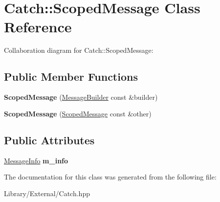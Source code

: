 \hypertarget{class_catch_1_1_scoped_message}{}\section{Catch\+:\+:Scoped\+Message Class Reference}
\label{class_catch_1_1_scoped_message}


Collaboration diagram for Catch\+:\+:Scoped\+Message\+:
\subsection*{Public Member Functions}
\begin{DoxyCompactItemize}
\item 
\hypertarget{class_catch_1_1_scoped_message_a5cc59f0f2ebe840e6607f83004d49a17}{}{\bfseries Scoped\+Message} (\hyperlink{struct_catch_1_1_message_builder}{Message\+Builder} const \&builder)\label{class_catch_1_1_scoped_message_a5cc59f0f2ebe840e6607f83004d49a17}

\item 
\hypertarget{class_catch_1_1_scoped_message_ae03a17fd47220d563d4abc73e7518e29}{}{\bfseries Scoped\+Message} (\hyperlink{class_catch_1_1_scoped_message}{Scoped\+Message} const \&other)\label{class_catch_1_1_scoped_message_ae03a17fd47220d563d4abc73e7518e29}

\end{DoxyCompactItemize}
\subsection*{Public Attributes}
\begin{DoxyCompactItemize}
\item 
\hypertarget{class_catch_1_1_scoped_message_ae6e1476f389cc6e1586f033b3747b27b}{}\hyperlink{struct_catch_1_1_message_info}{Message\+Info} {\bfseries m\+\_\+info}\label{class_catch_1_1_scoped_message_ae6e1476f389cc6e1586f033b3747b27b}

\end{DoxyCompactItemize}


The documentation for this class was generated from the following file\+:\begin{DoxyCompactItemize}
\item 
Library/\+External/Catch.\+hpp\end{DoxyCompactItemize}
